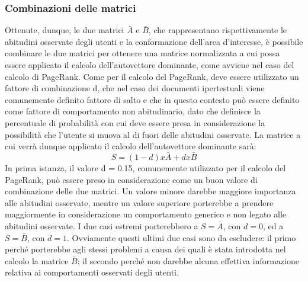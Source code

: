 \subsubsection{Combinazioni delle matrici}
Ottenute, dunque, le due matrici $\bar{A}$ e $\bar{B}$, che rappresentano rispettivamente
le abitudini osservate degli utenti e la conformazione dell'area d'interesse, \`e
possibile combinare le due matrici per ottenere una matrice normalizzata a cui
possa essere applicato il calcolo dell'autovettore dominante, come avviene nel
caso del calcolo di PageRank. Come per il calcolo del PageRank, deve essere
utilizzato un fattore di combinazione d, che nel caso dei documenti ipertestuali
viene comunemente definito fattore di salto e che in questo contesto pu\`o essere
definito come fattore di comportamento non abitudinario, dato che definisce
la percentuale di probabilit\`a con cui deve essere presa in considerazione la
possibilit\`a che l'utente si muova al di fuori delle abitudini osservate. La matrice
a cui verr\`a dunque applicato il calcolo dell'autovettore dominante sar\`a:
$$
S = (1 - d) x \bar{A} + d x \bar{B}
$$
In prima istanza, il valore d = 0.15, comunemente utilizzato per il calcolo del
PageRank, pu\`o essere preso in considerazione come un buon valore di combinazione
delle due matrici. Un valore minore darebbe maggiore importanza alle
abitudini osservate, mentre un valore superiore porterebbe a prendere maggiormente
in considerazione un comportamento generico e non legato alle abitudini
osservate. I due casi estremi porterebbero a $S = \bar{A}$, con $d = 0$,
ed a $S = \bar{B}$, con $d = 1$. Ovviamente questi ultimi due casi sono da
escludere: il primo perch\'e porterebbe agli stessi problemi a causa dei quali \`e
stata introdotta nel calcolo la matrice $\bar{B}$; il secondo perch\'e non darebbe
alcuna effettiva informazione relativa ai comportamenti osservati degli utenti.

